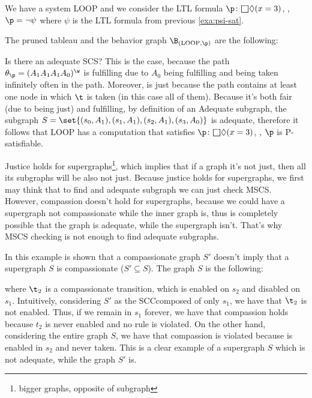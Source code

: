 \documentclass[oneside]{academica}
\begin{document}
\begin{example*}
  We have a system LOOP and we consider the LTL formula $\p \colon \msquare\Diamond(x = 3)$, \ie, $\p = \neg\psi$ where $\psi$ is the LTL formula from previous \autoref{exa:psi-sat}.

  The pruned tableau and the behavior graph $\B_{(\text{LOOP},\p)}$ are the following:
  \begin{center}
    
  \end{center}
  \begin{center}
    
  \end{center}

  Is there an adequate SCS?
  This is the case, because the path $\theta_\p = (A_1 A_1 A_1 A_0)^\w$ is fulfilling due to $A_0$ being fulfilling and being taken infinitely often in the path.
  Moreover, is just because the path contains at least one node in which $\t$ is taken (in this case all of them).
  Because it's both fair (due to being just) and fulfilling, by definition of an Adequate subgraph, the subgraph $S = \set{(s_0, A_1),(s_1, A_1),(s_2, A_1),(s_3, A_0)}$ is adequate, therefore it follows that LOOP has a computation that satisfies $\p \colon \msquare\Diamond(x = 3)$, \ie, $\p$ is P-satisfiable.
\end{example*}

Justice holds for supergraphs\footnote{bigger graphs, opposite of subgraph}, which implies that if a graph it's not just, then all its subgraphs will be also not just.
Because justice holds for supergraphs, we first may think that to find and adequate subgraph we can just check MSCS.
However, compassion doesn't hold for supergraphs, because we could have a supergraph not compassionate while the inner graph is, thus is completely possible that the graph is adequate, while the supergraph isn't.
That's why MSCS checking is not enough to find adequate subgraphs.

\begin{example*}
  In this example is shown that a compassionate graph $S'$ doesn't imply that a supergraph $S$ is compassionate ($S' \subseteq S$).
  The graph $S$ is the following: 
  \begin{center}
    
  \end{center}
  where $\t_2$ is a compassionate transition, which is enabled on $s_2$ and disabled on $s_1$.
  Intuitively, considering $S'$ as the SCC\footnotemark composed of only $s_1$, we have that $\t_2$ is not enabled.
  Thus, if we remain in $s_1$ forever, we have that compassion holds because $t_2$ is never enabled and no rule is violated.
  On the other hand, considering the entire graph $S$, we have that compassion is violated because is enabled in $s_2$ and never taken.
  This is a clear example of a supergraph $S$ which is not adequate, while the graph $S'$ is.
\end{example*}
\end{document}

